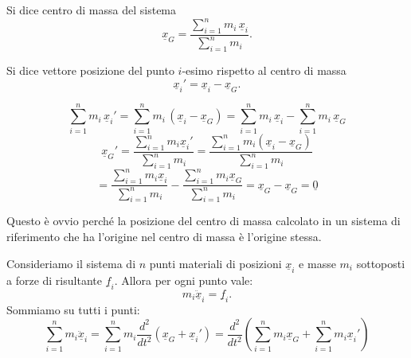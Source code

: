 \begin{definition}{}
Si dice centro di massa del sistema
\[
\underline{x}_G = \frac{\sum_{i=1}^{n} m_i \,\underline{x}_i}{\sum_{i=1}^{n} m_i}.
\]
\end{definition}

\begin{definition}{}
Si dice vettore posizione del punto $i$-esimo rispetto al centro di massa
\[
\underline{x}_i' = \underline{x}_i - \underline{x}_G.
\]
\end{definition}

\begin{figure}[H]
\centering
{}
\end{figure}

\begin{oss}{}
\[
\sum_{i=1}^{n} m_i \,\underline{x}_i' = \sum_{i=1}^{n} m_i \,(\underline{x}_i - \underline{x}_G) = \sum_{i=1}^{n} m_i \, \underline{x}_i - \sum_{i=1}^{n} m_i \,\underline{x}_G
\]
\[
\underline{x}_G'
=
\frac{\sum_{i=1}^{n} m_i \underline{x}_i'}{\sum_{i=1}^{n} m_i}
=
\frac{\sum_{i=1}^{n} m_i(\underline{x}_i-\underline{x}_G)}{\sum_{i=1}^{n} m_i}
\]
\[
=
\frac{\sum_{i=1}^{n} m_i \underline{x}_i}{\sum_{i=1}^{n} m_i}
-
\frac{\sum_{i=1}^{n} m_i \underline{x}_G}{\sum_{i=1}^{n} m_i}
=
\underline{x}_G-\underline{x}_G
=
\underline{0}
\]

Questo è ovvio perché la posizione del centro di massa calcolato in un sistema di riferimento che ha l'origine nel centro di massa è l'origine stessa.
\end{oss}

Consideriamo il sistema di $n$ punti materiali di posizioni $\underline{x}_i$ e masse $m_i$ sottoposti a forze di risultante $\underline{f}_i$. Allora per ogni punto vale:
\[
m_i \underline{\ddot{x}}_i = \underline{f}_i.
\]
Sommiamo su tutti i punti:
\[
\sum_{i=1}^{n} m_i \underline{\ddot{x}}_i = \sum_{i=1}^{n} m_i \frac{d^2}{dt^2} \left( \underline{x}_G + \underline{x}_i' \right) = \frac{d^2}{dt^2} \left( \sum_{i=1}^{n} m_i \underline{x}_G + \sum_{i=1}^{n} m_i \underline{x}_i' \right)
\]

